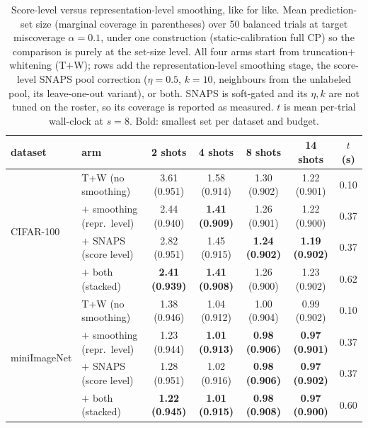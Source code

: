 \begin{table}[t]
\centering
\small
\setlength{\tabcolsep}{4pt}
\caption{Score-level versus representation-level smoothing, like for like. Mean prediction-set size (marginal coverage in parentheses) over 50 balanced trials at target miscoverage $\alpha=0.1$, under one construction (static-calibration full CP) so the comparison is purely at the set-size level. All four arms start from truncation$+$whitening (T$+$W); rows add the representation-level smoothing stage, the score-level SNAPS pool correction ($\eta=0.5$, $k=10$, neighbours from the unlabeled pool, its leave-one-out variant), or both. SNAPS is soft-gated and its $\eta,k$ are not tuned on the roster, so its coverage is reported as measured. $t$ is mean per-trial wall-clock at $s=8$. Bold: smallest set per dataset and budget.}
\label{tab:snaps-vs-smoothing}
\begin{tabular}{llccccc}
\toprule
dataset & arm & 2 shots & 4 shots & 8 shots & 14 shots & $t$ (s)\\
\midrule
\multirow{4}{*}{CIFAR-100} & T+W (no smoothing) & 3.61 {\scriptsize(0.951)} & 1.58 {\scriptsize(0.914)} & 1.30 {\scriptsize(0.902)} & 1.22 {\scriptsize(0.901)} & 0.10\\
 & $+$ smoothing (repr.\ level) & 2.44 {\scriptsize(0.940)} & \textbf{1.41 {\scriptsize(0.909)}} & 1.26 {\scriptsize(0.901)} & 1.22 {\scriptsize(0.900)} & 0.37\\
 & $+$ SNAPS (score level) & 2.82 {\scriptsize(0.951)} & 1.45 {\scriptsize(0.915)} & \textbf{1.24 {\scriptsize(0.902)}} & \textbf{1.19 {\scriptsize(0.902)}} & 0.37\\
 & $+$ both (stacked) & \textbf{2.41 {\scriptsize(0.939)}} & \textbf{1.41 {\scriptsize(0.908)}} & 1.26 {\scriptsize(0.900)} & 1.23 {\scriptsize(0.902)} & 0.62\\
\midrule
\multirow{4}{*}{miniImageNet} & T+W (no smoothing) & 1.38 {\scriptsize(0.946)} & 1.04 {\scriptsize(0.912)} & 1.00 {\scriptsize(0.904)} & 0.99 {\scriptsize(0.902)} & 0.10\\
 & $+$ smoothing (repr.\ level) & 1.23 {\scriptsize(0.944)} & \textbf{1.01 {\scriptsize(0.913)}} & \textbf{0.98 {\scriptsize(0.906)}} & \textbf{0.97 {\scriptsize(0.901)}} & 0.37\\
 & $+$ SNAPS (score level) & 1.28 {\scriptsize(0.951)} & 1.02 {\scriptsize(0.916)} & \textbf{0.98 {\scriptsize(0.906)}} & \textbf{0.97 {\scriptsize(0.902)}} & 0.37\\
 & $+$ both (stacked) & \textbf{1.22 {\scriptsize(0.945)}} & \textbf{1.01 {\scriptsize(0.915)}} & \textbf{0.98 {\scriptsize(0.908)}} & \textbf{0.97 {\scriptsize(0.900)}} & 0.60\\
\bottomrule
\end{tabular}
\end{table}
